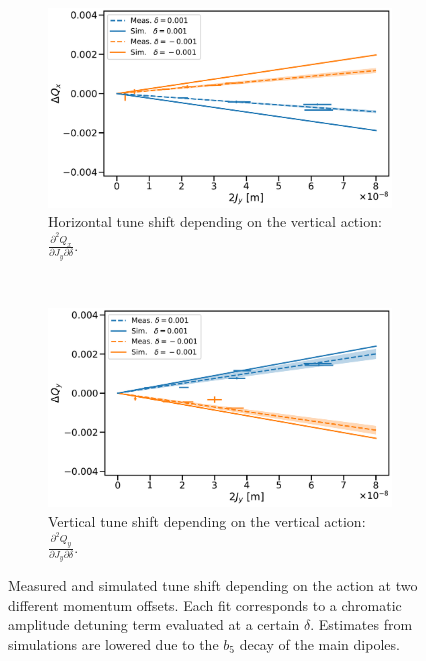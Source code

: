 \begin{figure}[H]
  \centering
  \begin{subfigure}{0.8\textwidth}
      \centering
      \includegraphics[width=\textwidth]{images/chromatic_amplitude_detuning/B2_Qxy_decay0.47.pdf}
      \caption{Horizontal tune shift depending on the vertical action: 
      $\frac{\partial^2 Q_x}{\partial J_y \partial \delta}$.}
      \label{figure:decapoles:decay:b2qxy}
  \end{subfigure}
  \\[1em]
  \begin{subfigure}{0.8\textwidth}
      \centering
      \includegraphics[width=\textwidth]{images/chromatic_amplitude_detuning/B2_Qyy_decay0.47.pdf}
      \caption{Vertical tune shift depending on the vertical action: 
      $\frac{\partial^2 Q_y}{\partial J_y \partial \delta}$.}
      \label{figure:decapoles:decay:b2qyy}
  \end{subfigure}
  \caption{Measured and simulated tune shift depending on the action at two different momentum
  offsets. Each fit corresponds to a chromatic amplitude detuning term evaluated at a certain
  $\delta$. Estimates from simulations are lowered due to the $b_5$ decay of the main dipoles.}
  \label{figure:decapoles:decay:two_terms}
\end{figure}

